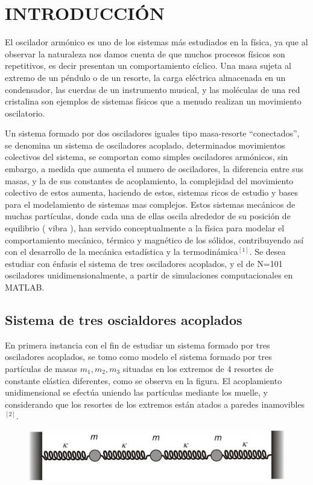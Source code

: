 \documentclass[11pt,letterpaper,twocolumn]{article}
\begin{document}
\section*{\normalsize{INTRODUCCIÓN}} 
El oscilador armónico es uno de los sistemas más estudiados en la física, ya que al observar la naturaleza nos damos cuenta de que muchos procesos físicos son repetitivos, es decir presentan un comportamiento cíclico. Una masa sujeta al extremo de un péndulo o de un resorte, la carga eléctrica almacenada en un condensador, las cuerdas de un instrumento musical, y las moléculas de una red cristalina son ejemplos de sistemas físicos que a menudo realizan un movimiento oscilatorio.\\ 
\par
Un sistema formado por dos osciladores iguales tipo masa-resorte “conectados”, se denomina un sistema de osciladores acoplado, determinados movimientos colectivos del sistema, se comportan como simples osciladores armónicos, sin embargo, a medida que aumenta el numero de osciladores, la diferencia entre sus masas, y la de sus constantes de acoplamiento, la complejidad del movimiento colectivo de estos aumenta, haciendo de estos, sistemas ricos de estudio y bases para el modelamiento de sistemas mas complejos. Estos sistemas mecánicos de muchas partículas, donde cada una de ellas oscila alrededor de su posición de equilibrio ( vibra ), han servido conceptualmente a la física para modelar el comportamiento mecánico, térmico y magnético de los sólidos, contribuyendo así con el desarrollo de la mecánica estadística y la termodinámica$^{[1]}$. Se desea estudiar con énfasis el sistema de tres osciladores acoplados, y el de N=101 osciladores unidimensionalmente, a partir de simulaciones computacionales en MATLAB. 
\subsection*{Sistema de tres oscialdores acoplados}
En primera instancia con el fin de estudiar un sistema formado por tres osciladores acoplados, se tomo como modelo el sistema formado por tres partículas de masas $m_{1},m_{2},m_{3}$ situadas en los extremos de 4 resortes de constante elástica diferentes, como se observa en la figura. El acoplamiento unidimensional se efectúa uniendo las partículas mediante los muelle, y considerando que los resortes de los extremos están atados a paredes inamovibles$^{[2]}$.
\begin{figure}[h!]
\begin{center}
\includegraphics[scale=0.4]{3-o.jpeg}
\end{center}
\end{figure}
\end{document}
